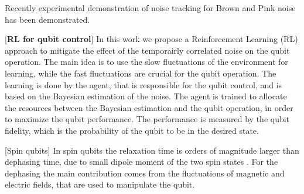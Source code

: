 \documentclass[aps,twocolumn,pra,notitlepage,]{revtex4-2}
\begin{document}
Recently experimental demonstration of noise tracking for Brown \cite{} and Pink \cite{} noise has been demonstrated. 

[\textbf{RL for qubit control}] In this work we propose a Reinforcement Learning (RL) approach to mitigate the effect of the temporairly correlated noise on the qubit operation. The main idea is to use the slow fluctuations of the environment for learning, while the fast fluctuations are crucial for the qubit operation. The learning is done by the agent, that is responsible for the qubit control, and is based on the Bayesian estimation of the noise. The agent is trained to allocate the resources between the Bayesian estimation and the qubit operation, in order to maximize the qubit performance. The performance is measured by the qubit fidelity, which is the probability of the qubit to be in the desired state. 


[Spin qubits] In spin qubits the relaxation time is orders of magnitude larger than dephasing time, due to small dipole moment of the two spin states \cite{}. For the dephasing the main contribution comes from the fluctuations of magnetic and electric fields, that are used to manipulate the qubit. 
\end{document}
